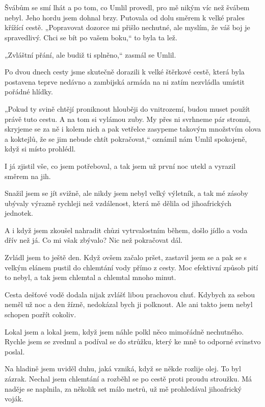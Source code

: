 \chapter{}

Švábům se smí lhát a po tom, co Umlil provedl, pro mě nikým víc než švábem nebyl. 
Jeho hordu jsem dohnal brzy. Putovala od dolu směrem k velké prales křížící cestě.
„Popravovat dozorce mi přišlo nechutné, ale myslím, že váš boj je spravedlivý. Chci se bít po vašem boku,“ to byla ta lež.

„Zvláštní přání, ale budiž ti splněno,“ zasmál se Umlil.

Po dvou dnech cesty jsme skutečně dorazili k velké štěrkové cestě, která byla postavena teprve nedávno a zambijská armáda na ni zatím nezvládla umístit pořádné hlídky.

 „Pokud ty svině chtějí proniknout hlouběji do vnitrozemí, budou muset použít právě tuto cestu. A na tom si vylámou zuby. My přes ni svrhneme pár stromů, skryjeme se za ně i kolem nich a pak vetřelce zasypeme takovým množstvím olova a koktejlů, že se jim nebude chtít pokračovat,“ oznámil nám Umlil spokojeně, když si místo prohlédl.
 
I já zjistil vše, co jsem potřeboval, a tak jsem už první noc utekl a vyrazil směrem na jih.

Snažil jsem se jít svižně, ale nikdy jsem nebyl velký výletník, a tak mé zásoby ubývaly výrazně rychleji než vzdálenost, která mě dělila od jihoafrických jednotek.

A i když jsem zkoušel nahradit chůzi vytrvalostním během, došlo jídlo a voda dřív než já. Co mi však zbývalo? Nic než pokračovat dál.
 
Zvládl jsem to ještě den. Když ovšem začalo pršet, zastavil jsem se a pak se s velkým elánem pustil do chlemtání vody přímo z cesty. Moc efektivní způsob pití to nebyl, a tak jsem chlemtal a chlemtal mnoho minut.
 
Cesta dešťové vodě dodala nijak zvlášť libou prachovou chuť. Kdybych za sebou neměl už noc a den žízně, nedokázal bych ji polknout. Ale ani takto jsem nebyl schopen pozřít cokoliv.

Lokal jsem a lokal jsem, když jsem náhle polkl něco mimořádně nechutného. Rychle jsem se zvednul a podíval se do strůžku, který ke mně to odporné svinstvo poslal.
	
 Na hladině jsem uviděl duhu, jaká vzniká, když se někde rozlije olej. To byl zázrak. Nechal jsem chlemtání a rozběhl se po cestě proti proudu stroužku.
Má naděje se naplnila, za několik set málo metrů, už mě prohledával jihoafrický voják.    

